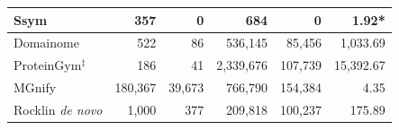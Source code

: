 \begin{table}[H]
{\begin{tabular}{@{}lrrrrr}
        Ssym & 357 & 0 & 684 & 0 & 1.92* \\
        \midrule
        Domainome & 522 & 86 & 536,145 & 85,456 & 1,033.69 \\
        ProteinGym$^\ddagger$ & 186 & 41 & 2,339,676 & 107,739 & 15,392.67 \\
        MGnify & 180,367 & 39,673 & 766,790 & 154,384 & 4.35 \\
        Rocklin \textit{de novo} & 1,000 & 377 & 209,818 & 100,237 & 175.89 \\
    \bottomrule
    \end{tabular}
    }
    \par\bigskip
\end{table}




